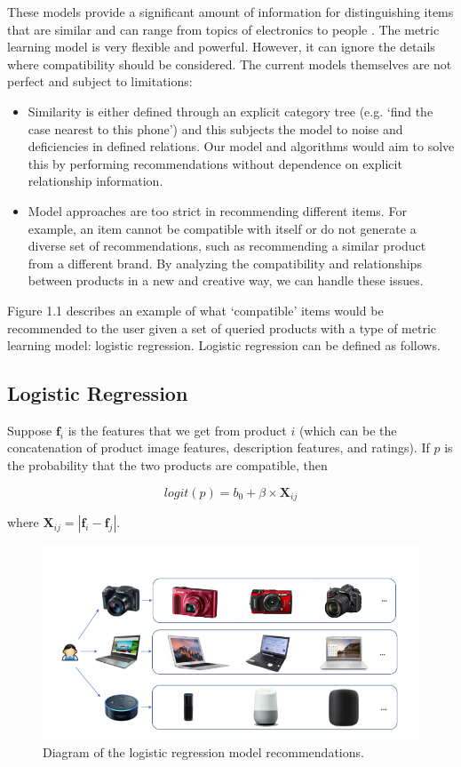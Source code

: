 These models provide a significant amount of information for distinguishing items that are similar and can range from topics of electronics to people \cite{dersaul}. The metric learning model is very flexible and powerful. However, it can ignore the details where compatibility should be considered. The current models themselves are not perfect and subject to limitations:

\begin{itemize}
    \item Similarity is either defined through an explicit category tree (e.g. `find the case nearest to this phone') and this subjects the model to noise and deficiencies in defined relations. Our model and algorithms would aim to solve this by performing recommendations without dependence on explicit relationship information.
    \item Model approaches are too strict in recommending different items. For example, an item cannot be compatible with itself or do not generate a diverse set of recommendations, such as recommending a similar product from a different brand. By analyzing the compatibility and relationships between products in a new and creative way, we can handle these issues.
\end{itemize}

Figure 1.1 describes an example of what `compatible' items would be recommended to the user given a set of queried products with a type of metric learning model: logistic regression. Logistic regression can be defined as follows.

\subsection{Logistic Regression}
Suppose $\mathbf{f}_i$ is the features that we get from product $i$ (which can be the concatenation of product image features, description features, and ratings). If $p$ is the probability that the two products are compatible, then

$$
logit(p) = b_0 + \beta \times \mathbf{X}_{ij}
$$

where $\mathbf{X}_{ij} = |\mathbf{f}_i - \mathbf{f}_j|$. 

\begin{figure}[h!]
\centering
\includegraphics[scale=0.5]{data/LogisticRegression.png}
\caption{Diagram of the logistic regression model recommendations.}
\end{figure}


